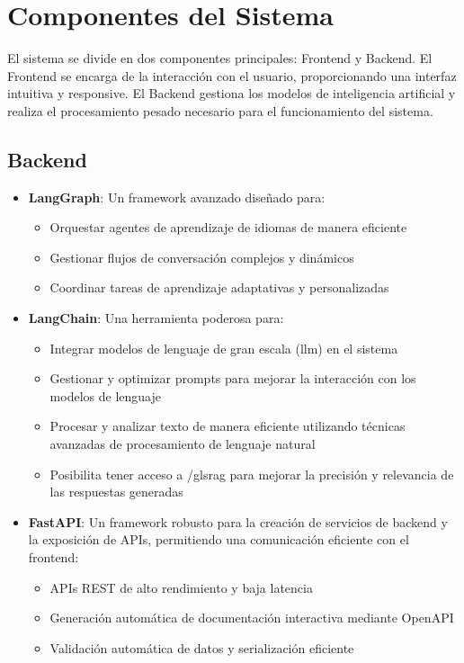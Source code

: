 \section{Componentes del Sistema}

El sistema se divide en dos componentes principales: Frontend y Backend. El Frontend se encarga de la interacción con el usuario, proporcionando una interfaz intuitiva y responsive. El Backend gestiona los modelos de inteligencia artificial y realiza el procesamiento pesado necesario para el funcionamiento del sistema.

\subsection{Backend}

\begin{itemize}
    \item \textbf{LangGraph}: Un framework avanzado diseñado para:
        \begin{itemize}
            \item Orquestar agentes de aprendizaje de idiomas de manera eficiente
            \item Gestionar flujos de conversación complejos y dinámicos
            \item Coordinar tareas de aprendizaje adaptativas y personalizadas
        \end{itemize}
        
        \item \textbf{LangChain}: Una herramienta poderosa para:
        \begin{itemize}
            \item Integrar modelos de lenguaje de gran escala (\gls{llm}) en el sistema
            \item Gestionar y optimizar prompts para mejorar la interacción con los modelos de lenguaje
            \item Procesar y analizar texto de manera eficiente utilizando técnicas avanzadas de procesamiento de lenguaje natural
            \item Posibilita tener acceso a /gls{rag} para mejorar la precisión y relevancia de las respuestas generadas
        \end{itemize}

        \item \textbf{FastAPI}: Un framework robusto para la creación de servicios de backend y la exposición de APIs, permitiendo una comunicación eficiente con el frontend:
        \begin{itemize}
            \item APIs REST de alto rendimiento y baja latencia
            \item Generación automática de documentación interactiva mediante OpenAPI
            \item Validación automática de datos y serialización eficiente
        \end{itemize}
\end{itemize}

